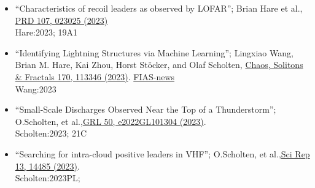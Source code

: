 \documentclass[fleqn,11pt]{article}
\begin{document}
\begin{itemize}
\begin{itemize}
\item ``Characteristics of recoil leaders as observed by LOFAR''; Brian Hare et al.,
    \href{https://doi.org/10.1103/PhysRevD.107.023025}{PRD 107, 023025 (2023)}
    \\Hare:2023; 19A1

\item ``Identifying Lightning Structures via Machine Learning'';
   Lingxiao Wang, Brian M. Hare, Kai Zhou, Horst St\"{o}cker, and Olaf Scholten,
   \href{https://doi.org/10.1016/j.chaos.2023.113346}{Chaos, Solitons \& Fractals 170, 113346 (2023)}.
   \href{https://fias.news/en/news-publicity/algorithms-illuminate-lightning-structures/?bid=3}{FIAS-news}
   \\Wang:2023

\item ``Small-Scale Discharges Observed Near the Top of a Thunderstorm''; O.Scholten, et al.,\href{http://doi.org/10.1029/2022GL101304}{GRL 50, e2022GL101304 (2023)}.
    \\Scholten:2023; 21C

\item ``Searching for intra-cloud positive leaders in VHF''; O.Scholten, et al.,\href{https://doi.org/10.1038/s41598-023-41218-x}{Sci Rep 13, 14485 (2023)}.
    \\Scholten:2023PL;

\end{itemize}
\end{itemize}
\end{document}
